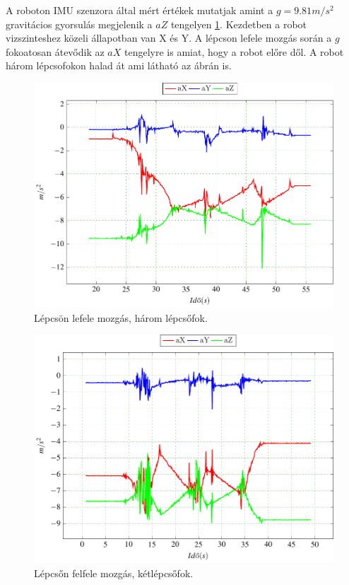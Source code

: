A roboton IMU szenzora által mért értékek mutatjak amint a $g=9.81 m/s^2$ gravitácios gyorsulás megjelenik a $aZ$ tengelyen \ref{fig:ImuLepcsoLe1}. Kezdetben a robot vizszinteshez közeli állapotban van X és Y.  A lépcson lefele mozgás során a $g$ fokoatosan átevődik az $aX$ tengelyre is amiat, hogy a robot előre dől. A robot három lépcsofokon halad át ami látható az ábrán is.

\begin{figure}[H]
  \begin{center}
  	\includegraphics[scale=0.8]{tikz/ImuLepcsoLe1.pdf}
  \end{center}
  \caption{Lépcsön lefele mozgás, három lépcsőfok.}
  \label{fig:ImuLepcsoLe1}
\end{figure}

\begin{figure}[H]
  \begin{center}
  	\includegraphics[scale=0.8]{tikz/ImuLepcsoFel1.pdf}
  \end{center}
  \caption{Lépcsőn felfele mozgás, kétlépcsőfok.}
  \label{fig:ImuLepcsoFel1}
\end{figure}

